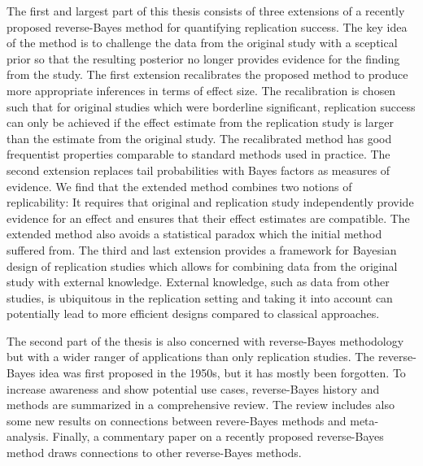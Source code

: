 The first and largest part of this thesis consists of three extensions of a
recently proposed reverse-Bayes method for quantifying replication success. The
key idea of the method is to challenge the data from the original study with a
sceptical prior so that the resulting posterior no longer provides evidence for
the finding from the study. The first extension recalibrates the proposed method
to produce more appropriate inferences in terms of effect size.
The recalibration is chosen such that for original studies which were borderline
significant, replication success can only be achieved if the effect estimate
from the replication study is larger than the estimate from the original study.
The recalibrated method has good frequentist properties comparable to standard
methods used in practice. The second extension replaces tail probabilities with
Bayes factors as measures of evidence.
We find that the extended method combines two notions of replicability: It
requires that original and replication study independently provide evidence for
an effect and ensures that their effect estimates are compatible. The extended
method also avoids a statistical paradox which the initial method suffered from.
The third and last extension provides a framework for Bayesian design of
replication studies which allows for combining data from the original study with
external knowledge. External knowledge, such as data from other studies, is
ubiquitous in the replication setting and taking it into account can potentially
lead to more efficient designs compared to classical approaches.

The second part of the thesis is also concerned with reverse-Bayes methodology
but with a wider ranger of applications than only replication studies. The
reverse-Bayes idea was first proposed in the 1950s, but it has mostly been
forgotten. To increase awareness and show potential use cases, reverse-Bayes
history and methods are summarized in a comprehensive review. The review
includes also some new results on connections between revere-Bayes methods and
meta-analysis. Finally, a commentary paper on a recently proposed reverse-Bayes
method draws connections to other reverse-Bayes methods.

